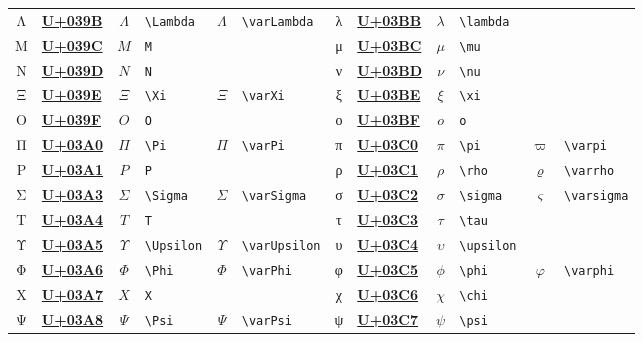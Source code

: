 \documentclass{ctexbook}
\newcommand{\rrun}[1]{\colorbox{Mulberry}{\href{https://unicode-table.com/#1/}{\color{White}\ttfamily{}\bfseries{}U+#1}}}
\begin{document}
\begin{table}[h!]
\begin{tabular}{c@{ }l c@{ }l c@{ }l c@{ }l c@{ }l c@{ }l}
		Λ & \rrun{039B} &  $\Lambda$ & \verb|\Lambda|  &  $\varLambda$ & \verb|\varLambda|  & λ & \rrun{03BB} &  $\lambda$ & \verb|\lambda|  &               &                    \\
		Μ & \rrun{039C} &        $M$ & \verb|M|        &               &                    & μ & \rrun{03BC} &      $\mu$ & \verb|\mu|      &               &                    \\
		Ν & \rrun{039D} &        $N$ & \verb|N|        &               &                    & ν & \rrun{03BD} &      $\nu$ & \verb|\nu|      &               &                    \\
		Ξ & \rrun{039E} &      $\Xi$ & \verb|\Xi|      &      $\varXi$ & \verb|\varXi|      & ξ & \rrun{03BE} &      $\xi$ & \verb|\xi|      &               &                    \\
		Ο & \rrun{039F} &        $O$ & \verb|O|        &               &                    & ο & \rrun{03BF} &        $o$ & \verb|o|        &               &                    \\
		Π & \rrun{03A0} &      $\Pi$ & \verb|\Pi|      &      $\varPi$ & \verb|\varPi|      & π & \rrun{03C0} &      $\pi$ & \verb|\pi|      &      $\varpi$ & \verb|\varpi|      \\
		Ρ & \rrun{03A1} &        $P$ & \verb|P|        &               &                    & ρ & \rrun{03C1} &     $\rho$ & \verb|\rho|     &     $\varrho$ & \verb|\varrho|     \\
		Σ & \rrun{03A3} &   $\Sigma$ & \verb|\Sigma|   &   $\varSigma$ & \verb|\varSigma|   & σ & \rrun{03C2} &   $\sigma$ & \verb|\sigma|   &   $\varsigma$ & \verb|\varsigma|   \\
		Τ & \rrun{03A4} &        $T$ & \verb|T|        &               &                    & τ & \rrun{03C3} &     $\tau$ & \verb|\tau|     &               &                    \\
		Υ & \rrun{03A5} & $\Upsilon$ & \verb|\Upsilon| & $\varUpsilon$ & \verb|\varUpsilon| & υ & \rrun{03C4} & $\upsilon$ & \verb|\upsilon| &               &                    \\
		Φ & \rrun{03A6} &     $\Phi$ & \verb|\Phi|     &     $\varPhi$ & \verb|\varPhi|     & φ & \rrun{03C5} &     $\phi$ & \verb|\phi|     &     $\varphi$ & \verb|\varphi|     \\
		Χ & \rrun{03A7} &        $X$ & \verb|X|        &               &                    & χ & \rrun{03C6} &     $\chi$ & \verb|\chi|     &               &                    \\
		Ψ & \rrun{03A8} &     $\Psi$ & \verb|\Psi|     & $\varPsi$     & \verb|\varPsi|     & ψ & \rrun{03C7} &     $\psi$ & \verb|\psi|     &               &                    \\

\end{tabular}
\end{table}
\end{document}
